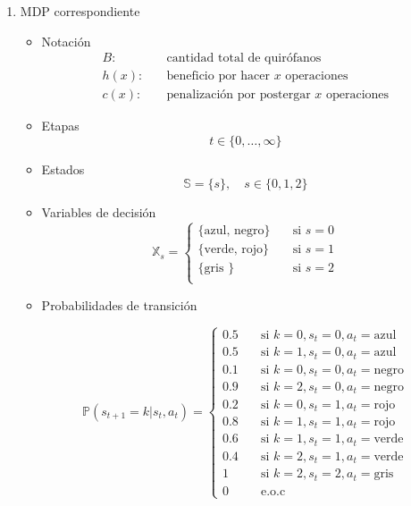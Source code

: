 \documentclass[letterpaper,10pt]{article}
\begin{document}
\begin{enumerate}
    \item MDP correspondiente
        \begin{itemize}
            \item Notación
            \begin{align*}
                B: & \quad \text{cantidad total de quirófanos} \\
                h(x): & \quad \text{beneficio por hacer $x$ operaciones} \\
                c(x): & \quad \text{penalización por postergar $x$ operaciones}
            \end{align*}
        
            \item Etapas
            $$ t \in \{0,\dots,\infty \} $$
        
            \item Estados
            $$ \mathds{S} = \{ s\}, \quad s \in \{ 0, 1, 2\}$$ 
            
            \item Variables de decisión
            \[
            \mathds{X}_s = 
                \begin{cases}
                    \{\text{azul, negro} \} & \quad \text{si } s=0 \\
                    \{\text{verde, rojo}\} & \quad \text{si } s=1 \\
                    \{\text{gris }\} & \quad \text{si } s=2\\
                \end{cases}
            \]
            
            \item Probabilidades de transición
            
            \[
            \mathds{P}(s_{t+1} = k | s_t, a_t) =
                 \begin{cases}
                    0.5 & \quad \text{si } k=0 , s_t=0 , a_t=\text{azul} \\ 
                    0.5 & \quad \text{si } k=1 , s_t=0 , a_t=\text{azul} \\
                    0.1 & \quad \text{si } k=0 , s_t=0 , a_t=\text{negro} \\ 
                    0.9 & \quad \text{si } k=2 , s_t=0 , a_t=\text{negro} \\ 
                    0.2 & \quad \text{si } k=0 , s_t=1 , a_t=\text{rojo} \\ 
                    0.8 & \quad \text{si } k=1 , s_t=1 , a_t=\text{rojo} \\ 
                    0.6 & \quad \text{si } k=1 , s_t=1 , a_t=\text{verde} \\ 
                    0.4 & \quad \text{si } k=2 , s_t=1 , a_t=\text{verde} \\ 
                    1 & \quad \text{si } k=2 , s_t=2 , a_t=\text{gris} \\ 
                    0 & \quad \text{e.o.c } 
                 \end{cases}
            \]
        

\end{itemize}
\end{enumerate}
\end{document}
